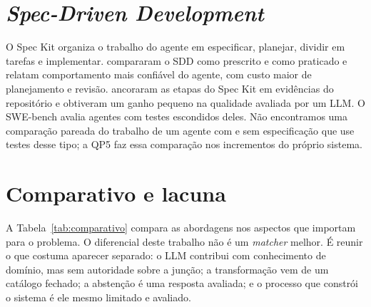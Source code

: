 \section{\emph{Spec-Driven Development}}
\label{sec:trabalhosrelacionados-sdd}

O Spec Kit \cite{speckit} organiza o trabalho do agente em especificar,
planejar, dividir em tarefas e implementar. 
compararam o SDD como prescrito e como praticado e relatam comportamento mais
confiável do agente, com custo maior de planejamento e revisão.
 ancoraram as etapas do Spec Kit em
evidências do repositório e obtiveram um ganho pequeno na qualidade avaliada
por um LLM. O SWE-bench \cite{jimenez2024swebench} avalia agentes com testes
escondidos deles. Não encontramos uma comparação pareada do trabalho de um
agente com e sem especificação que use testes desse tipo; a QP5 faz essa
comparação nos incrementos do próprio sistema.

\section{Comparativo e lacuna}
\label{sec:trabalhosrelacionados-comparativo-e-lacuna}

A Tabela~\ref{tab:comparativo} compara as abordagens nos aspectos que
importam para o problema. O diferencial deste trabalho não é um
\emph{matcher} melhor. É reunir o que costuma aparecer separado: o LLM
contribui com conhecimento de domínio, mas sem autoridade sobre a junção; a
transformação vem de um catálogo fechado; a abstenção é uma resposta
avaliada; e o processo que constrói o sistema é ele mesmo limitado e
avaliado.

